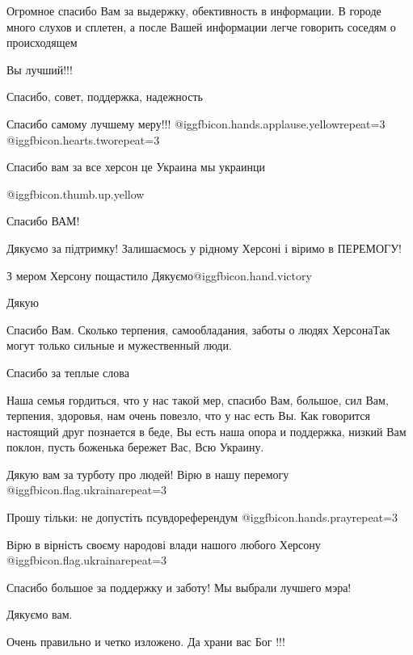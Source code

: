 \begin{itemize}

Огромное спасибо Вам за выдержку, обективность в информации. В городе много
слухов и сплетен, а после Вашей информации легче говорить соседям о
происходящем

Вы лучший!!!

Спасибо, совет, поддержка, надежность

Спасибо самому лучшему меру!!!  @igg{fbicon.hands.applause.yellow}{repeat=3}  @igg{fbicon.hearts.two}{repeat=3} 

Спасибо вам за все херсон це Украина мы украинци

 @igg{fbicon.thumb.up.yellow} 

Спасибо ВАМ!

Дякуємо за підтримку! Залишаємось у рідному Херсоні і віримо в ПЕРЕМОГУ!

З мером Херсону пощастило
Дякуємо@igg{fbicon.hand.victory}

Дякую

Спасибо Вам. Сколько терпения, самообладания, заботы о людях ХерсонаТак могут
только сильные и мужественный люди.

Спасибо за теплые слова


Наша семья гордиться, что у нас такой мер, спасибо Вам, большое, сил
Вам, терпения, здоровья, нам очень повезло, что у нас есть Вы. Как говорится
настоящий друг познается в беде, Вы есть наша опора и поддержка, низкий Вам
поклон, пусть боженька бережет Вас, Всю Украину.


Дякую вам за турботу про людей! Вірю в нашу перемогу @igg{fbicon.flag.ukraina}{repeat=3}

Прошу тільки: не допустіть псувдореферендум  @igg{fbicon.hands.pray}{repeat=3} 

Вірю в вірність своєму народові влади нашого любого Херсону @igg{fbicon.flag.ukraina}{repeat=3}

Спасибо большое за поддержку и заботу! Мы выбрали лучшего мэра!

Дякуємо вам.

Очень правильно и четко изложено. Да храни вас Бог !!!


\end{itemize}
